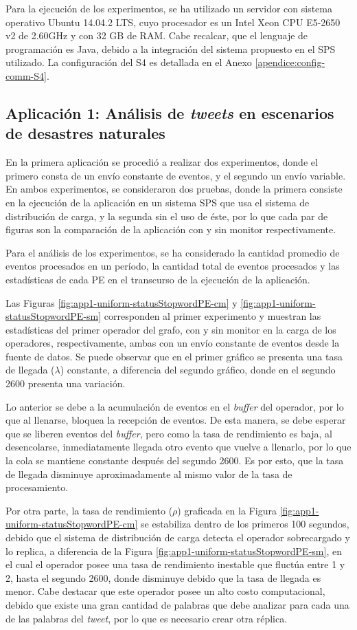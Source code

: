 Para la ejecución de los experimentos, se ha utilizado un servidor con sistema operativo Ubuntu 14.04.2 LTS, cuyo procesador es un Intel Xeon CPU E5-2650 v2 de 2.60GHz y con 32 GB de RAM. Cabe recalcar, que el lenguaje de programación es Java, debido a la integración del sistema propuesto en el SPS utilizado. La configuración del S4 es detallada en el Anexo \ref{apendice:config-comm-S4}.

\subsection{Aplicación 1: Análisis de \textit{tweets} en escenarios de desastres naturales}
En la primera aplicación se procedió a realizar dos experimentos, donde el primero consta de un envío constante de eventos, y el segundo un envío variable. En ambos experimentos, se consideraron dos pruebas, donde la primera consiste en la ejecución de la aplicación en un sistema SPS que usa el sistema de distribución de carga, y la segunda sin el uso de éste, por lo que cada par de figuras son la comparación de la aplicación con y sin monitor respectivamente.

Para el análisis de los experimentos, se ha considerado la cantidad promedio de eventos procesados en un período, la cantidad total de eventos procesados y las estadísticas de cada PE en el transcurso de la ejecución de la aplicación.

Las Figuras \ref{fig:app1-uniform-statusStopwordPE-cm} y \ref{fig:app1-uniform-statusStopwordPE-sm} corresponden al primer experimento y muestran las estadísticas del primer operador del grafo, con y sin monitor en la carga de los operadores, respectivamente, ambas con un envío constante de eventos desde la fuente de datos. Se puede observar que en el primer gráfico se presenta una tasa de llegada ($\lambda$) constante, a diferencia del segundo gráfico, donde en el segundo 2600 presenta una variación.

Lo anterior se debe a la acumulación de eventos en el \textit{buffer} del operador, por lo que al llenarse, bloquea la recepción de eventos. De esta manera, se debe esperar que se liberen eventos del \textit{buffer}, pero como la tasa de rendimiento es baja, al desencolarse, inmediatamente llegada otro evento que vuelve a llenarlo, por lo que la cola se mantiene constante después del segundo 2600. Es por esto, que la tasa de llegada disminuye aproximadamente al mismo valor de la tasa de procesamiento.

Por otra parte, la tasa de rendimiento ($\rho$) graficada en la Figura \ref{fig:app1-uniform-statusStopwordPE-cm} se estabiliza dentro de los primeros 100 segundos, debido que el sistema de distribución de carga detecta el operador sobrecargado y lo replica, a diferencia de la Figura \ref{fig:app1-uniform-statusStopwordPE-sm}, en el cual el operador posee una tasa de rendimiento inestable que fluctúa entre 1 y 2, hasta el segundo 2600, donde disminuye debido que la tasa de llegada es menor. Cabe destacar que este operador posee un alto costo computacional, debido que existe una gran cantidad de palabras que debe analizar para cada una de las palabras del \textit{tweet}, por lo que es necesario crear otra réplica.

